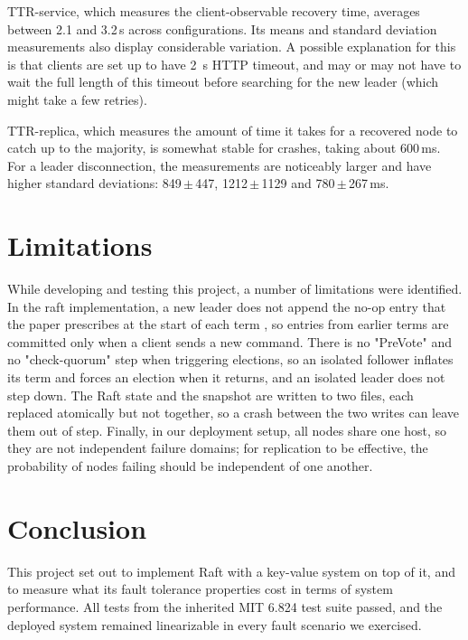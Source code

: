 \documentclass[conference]{IEEEtran}
\begin{document}
TTR-service, which measures the client-observable recovery time, averages between 2.1 and 3.2\,s across configurations. Its means and standard deviation measurements also display considerable variation. A possible explanation for this is that clients are set up to have 2~s HTTP timeout, and may or may not have to wait the full length of this timeout before searching for the new leader (which might take a few retries).

TTR-replica, which measures the amount of time it takes for a recovered node to catch up to the majority, is somewhat stable for crashes, taking about 600\,ms. For a leader disconnection, the measurements are noticeably larger and have higher standard deviations: 849\,$\pm$\,447, 1212\,$\pm$\,1129 and 780\,$\pm$\,267\,ms.


\section{Limitations}\label{sec:limits}
While developing and testing this project, a number of limitations were identified. In the raft implementation, a new leader does not append the no-op entry that the paper prescribes at the start of each term \cite{raft2014}, so entries from earlier terms are committed only when a client sends a new command. There is no "PreVote" and no "check-quorum" step when triggering elections, so an isolated follower inflates its term and forces an election when it returns, and an isolated leader does not step down. The Raft state and the snapshot are written to two files, each replaced atomically but not together, so a crash between the two writes can leave them out of step. Finally, in our deployment setup, all nodes share one host, so they are not independent failure domains; for replication to be effective, the probability of nodes failing should be independent of one another.


\section{Conclusion}
\label{sec:conclusion}
This project set out to implement Raft with a key-value system on top of it, and to measure what its fault tolerance properties cost in terms of system performance. All tests from the inherited MIT 6.824 test suite passed, and the deployed system remained linearizable in every fault scenario we exercised.
\end{document}
